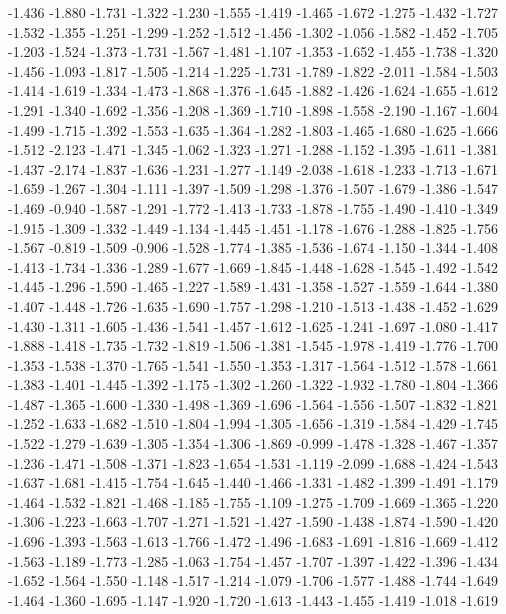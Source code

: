 \documentclass[9pt]{article}
\theoremstyle{plain}
\theoremstyle{definition}
\theoremstyle{remark}
\numberwithin{equation}{section}
\begin{document}
-1.436
-1.880
-1.731
-1.322
-1.230
-1.555
-1.419
-1.465
-1.672
-1.275
-1.432
-1.727
-1.532
-1.355
-1.251
-1.299
-1.252
-1.512
-1.456
-1.302
-1.056
-1.582
-1.452
-1.705
-1.203
-1.524
-1.373
-1.731
-1.567
-1.481
-1.107
-1.353
-1.652
-1.455
-1.738
-1.320
-1.456
-1.093
-1.817
-1.505
-1.214
-1.225
-1.731
-1.789
-1.822
-2.011
-1.584
-1.503
-1.414
-1.619
-1.334
-1.473
-1.868
-1.376
-1.645
-1.882
-1.426
-1.624
-1.655
-1.612
-1.291
-1.340
-1.692
-1.356
-1.208
-1.369
-1.710
-1.898
-1.558
-2.190
-1.167
-1.604
-1.499
-1.715
-1.392
-1.553
-1.635
-1.364
-1.282
-1.803
-1.465
-1.680
-1.625
-1.666
-1.512
-2.123
-1.471
-1.345
-1.062
-1.323
-1.271
-1.288
-1.152
-1.395
-1.611
-1.381
-1.437
-2.174
-1.837
-1.636
-1.231
-1.277
-1.149
-2.038
-1.618
-1.233
-1.713
-1.671
-1.659
-1.267
-1.304
-1.111
-1.397
-1.509
-1.298
-1.376
-1.507
-1.679
-1.386
-1.547
-1.469
-0.940
-1.587
-1.291
-1.772
-1.413
-1.733
-1.878
-1.755
-1.490
-1.410
-1.349
-1.915
-1.309
-1.332
-1.449
-1.134
-1.445
-1.451
-1.178
-1.676
-1.288
-1.825
-1.756
-1.567
-0.819
-1.509
-0.906
-1.528
-1.774
-1.385
-1.536
-1.674
-1.150
-1.344
-1.408
-1.413
-1.734
-1.336
-1.289
-1.677
-1.669
-1.845
-1.448
-1.628
-1.545
-1.492
-1.542
-1.445
-1.296
-1.590
-1.465
-1.227
-1.589
-1.431
-1.358
-1.527
-1.559
-1.644
-1.380
-1.407
-1.448
-1.726
-1.635
-1.690
-1.757
-1.298
-1.210
-1.513
-1.438
-1.452
-1.629
-1.430
-1.311
-1.605
-1.436
-1.541
-1.457
-1.612
-1.625
-1.241
-1.697
-1.080
-1.417
-1.888
-1.418
-1.735
-1.732
-1.819
-1.506
-1.381
-1.545
-1.978
-1.419
-1.776
-1.700
-1.353
-1.538
-1.370
-1.765
-1.541
-1.550
-1.353
-1.317
-1.564
-1.512
-1.578
-1.661
-1.383
-1.401
-1.445
-1.392
-1.175
-1.302
-1.260
-1.322
-1.932
-1.780
-1.804
-1.366
-1.487
-1.365
-1.600
-1.330
-1.498
-1.369
-1.696
-1.564
-1.556
-1.507
-1.832
-1.821
-1.252
-1.633
-1.682
-1.510
-1.804
-1.994
-1.305
-1.656
-1.319
-1.584
-1.429
-1.745
-1.522
-1.279
-1.639
-1.305
-1.354
-1.306
-1.869
-0.999
-1.478
-1.328
-1.467
-1.357
-1.236
-1.471
-1.508
-1.371
-1.823
-1.654
-1.531
-1.119
-2.099
-1.688
-1.424
-1.543
-1.637
-1.681
-1.415
-1.754
-1.645
-1.440
-1.466
-1.331
-1.482
-1.399
-1.491
-1.179
-1.464
-1.532
-1.821
-1.468
-1.185
-1.755
-1.109
-1.275
-1.709
-1.669
-1.365
-1.220
-1.306
-1.223
-1.663
-1.707
-1.271
-1.521
-1.427
-1.590
-1.438
-1.874
-1.590
-1.420
-1.696
-1.393
-1.563
-1.613
-1.766
-1.472
-1.496
-1.683
-1.691
-1.816
-1.669
-1.412
-1.563
-1.189
-1.773
-1.285
-1.063
-1.754
-1.457
-1.707
-1.397
-1.422
-1.396
-1.434
-1.652
-1.564
-1.550
-1.148
-1.517
-1.214
-1.079
-1.706
-1.577
-1.488
-1.744
-1.649
-1.464
-1.360
-1.695
-1.147
-1.920
-1.720
-1.613
-1.443
-1.455
-1.419
-1.018
-1.619
\end{document}
